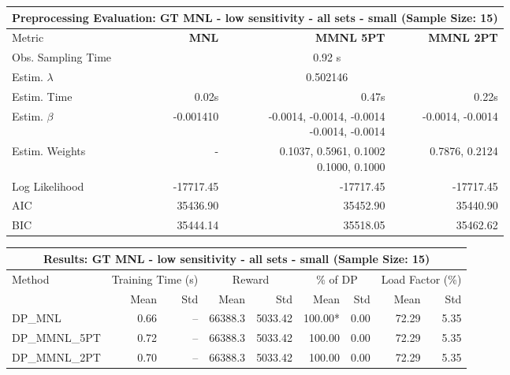
\begin{samepage}
\begin{center}
  \small
  \begin{tabular}{l|r|r|r}
    \toprule
    \multicolumn{4}{c}{\textbf{Preprocessing Evaluation: GT MNL - low sensitivity - all sets - small (Sample Size: 15)}} \\
    \midrule
    Metric & \textbf{MNL} & \textbf{MMNL 5PT} & \textbf{MMNL 2PT} \\
    \midrule
    Obs. Sampling Time & \multicolumn{3}{c}{0.92 s} \\
    Estim. $\lambda$ & \multicolumn{3}{c}{0.502146} \\
    Estim. Time & 0.02s & 0.47s & 0.22s \\
    Estim. $\beta$ & -0.001410 & \makecell[tr]{-0.0014, -0.0014, -0.0014 \\ -0.0014, -0.0014} & -0.0014, -0.0014 \\
    Estim. Weights & - & \makecell[tr]{0.1037, 0.5961, 0.1002 \\ 0.1000, 0.1000} & 0.7876, 0.2124 \\
    Log Likelihood & -17717.45 & -17717.45 & -17717.45 \\
    AIC & 35436.90 & 35452.90 & 35440.90 \\
    BIC & 35444.14 & 35518.05 & 35462.62 \\
    \bottomrule
  \end{tabular}
\end{center}
\begin{center}
  \small
  \begin{tabular}{l|rr|rr|rr|rr}
    \toprule
    \multicolumn{9}{c}{\textbf{Results: GT MNL - low sensitivity - all sets - small (Sample Size: 15)}} \\
    \midrule
    Method & \multicolumn{2}{c|}{Training Time (s)} & \multicolumn{2}{c|}{Reward} & \multicolumn{2}{c|}{\% of DP} & \multicolumn{2}{c}{Load Factor (\%)} \\
    & Mean & Std & Mean & Std & Mean & Std & Mean & Std \\
    \midrule
    DP\_MNL      &     0.66 &    -- &    66388.3 &    5033.42 & 100.00* &    0.00 &   72.29 &    5.35 \\
    DP\_MMNL\_5PT &     0.72 &    -- &    66388.3 &    5033.42 &  100.00 &    0.00 &   72.29 &    5.35 \\
    DP\_MMNL\_2PT &     0.70 &    -- &    66388.3 &    5033.42 &  100.00 &    0.00 &   72.29 &    5.35 \\
    \midrule

\end{tabular}
\end{center}
\end{samepage}
